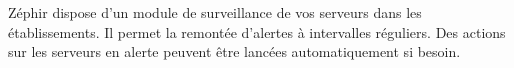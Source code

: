 Zéphir dispose d'un module de surveillance de vos serveurs dans les 
établissements. Il permet la remontée d'alertes à intervalles réguliers. 
Des actions sur les serveurs en alerte peuvent être lancées automatiquement 
si besoin.


